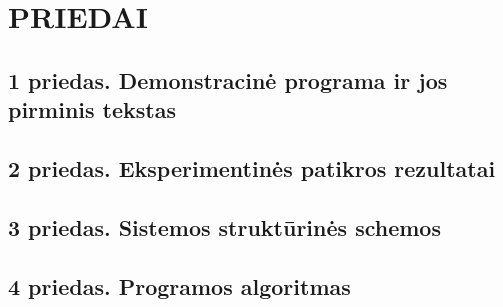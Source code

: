 \documentclass[]{vgtuef}
\begin{document}
\section*{PRIEDAI}

\subsection*{1 priedas. Demonstracinė programa ir jos pirminis tekstas}
\subsection*{2 priedas. Eksperimentinės patikros rezultatai}
\subsection*{3 priedas. Sistemos struktūrinės schemos}
\subsection*{4 priedas. Programos algoritmas}

\begin{cfigure}[!h]
  \centering
  
\end{cfigure}

\begin{cfigure}[!h]
  \centering
  
\end{cfigure}

\newpage
\end{document}
